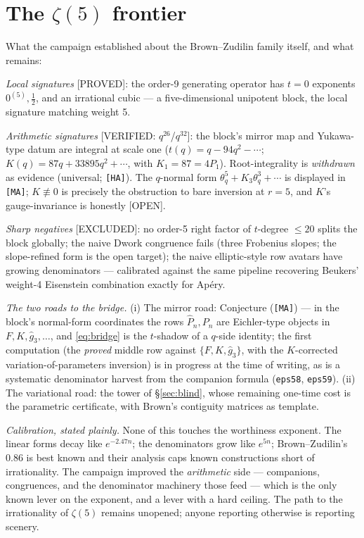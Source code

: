 \documentclass[11pt,reqno]{amsart}
\theoremstyle{plain}
\theoremstyle{definition}
\theoremstyle{remark}
\newcommand{\thq}{\theta_q}
\newcommand{\Proved}{\textup{\textsf{[PROVED]}}}
\newcommand{\VerifiedR}[1]{\textup{\textsf{[VERIFIED: #1]}}}
\newcommand{\Excluded}{\textup{\textsf{[EXCLUDED]}}}
\newcommand{\Open}{\textup{\textsf{[OPEN]}}}
\newcommand{\MA}{\texttt{[MA]}}
\newcommand{\HA}{\texttt{[HA]}}
\begin{document}
\section{The $\zeta(5)$ frontier}\label{sec:frontier}

What the campaign established about the Brown--Zudilin family itself, and
what remains:

\emph{Local signatures} \Proved: the order-9 generating operator has
$t=0$ exponents $0^{(5)},\tfrac12$, and an irrational cubic --- a
five-dimensional unipotent block, the local signature matching weight 5.

\emph{Arithmetic signatures} \VerifiedR{$q^{26}$/$q^{32}$}: the block's
mirror map and Yukawa-type datum are integral at scale one
($t(q)=q-94q^2-\cdots$; $K(q)=87q+33895q^2+\cdots$, with $K_1=87=4P_1$).
Root-integrality is \emph{withdrawn} as evidence (universal; \HA). The
$q$-normal form $\thq^5+K_3\thq^3+\cdots$ is displayed in \MA;
$K\not\equiv0$ is precisely the obstruction to bare inversion at $r=5$,
and $K$'s gauge-invariance is honestly \Open.

\emph{Sharp negatives} \Excluded: no order-5 right factor of $t$-degree
$\le20$ splits the block globally; the naive Dwork congruence fails (three
Frobenius slopes; the slope-refined form is the open target); the naive
elliptic-style row avatars have growing denominators --- calibrated
against the same pipeline recovering Beukers' weight-4 Eisenstein
combination exactly for Ap\'ery.

\emph{The two roads to the bridge.} (i) The mirror road:
Conjecture (\MA) --- in the block's normal-form coordinates the rows
$\hat P_n,P_n$ are Eichler-type objects in $F,K,\hat g_3,\dots$, and
\eqref{eq:bridge} is the $t$-shadow of a $q$-side identity; the first
computation (the \emph{proved} middle row against $\{F,K,\hat g_3\}$,
with the $K$-corrected variation-of-parameters inversion) is in progress
at the time of writing, as is a systematic denominator harvest from the
companion formula (\texttt{eps58}, \texttt{eps59}). (ii) The variational
road: the tower of \S\ref{sec:blind}, whose remaining one-time cost is
the parametric certificate, with Brown's contiguity matrices as template.

\emph{Calibration, stated plainly.} None of this touches the worthiness
exponent. The linear forms decay like $e^{-2.47n}$; the denominators grow
like $e^{5n}$; Brown--Zudilin's $0.86$ is best known and their analysis
caps known constructions short of irrationality. The campaign improved
the \emph{arithmetic} side --- companions, congruences, and the
denominator machinery those feed --- which is the only known lever on the
exponent, and a lever with a hard ceiling. The path to the irrationality
of $\zeta(5)$ remains unopened; anyone reporting otherwise is reporting
scenery.
\end{document}
